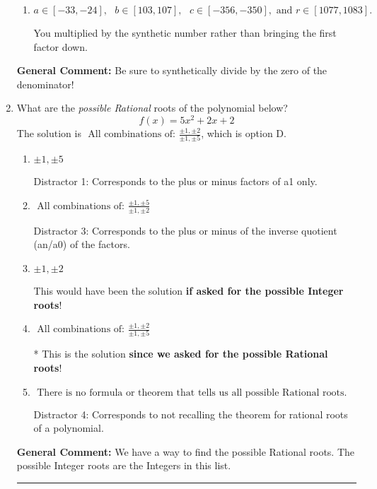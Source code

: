 \documentclass{extbook}[14pt]
\newcommand{\litem}[1]{\item #1

\rule{\textwidth}{0.4pt}}
\begin{document}
\begin{enumerate}
{\begin{enumerate}[label=\Alph*.]
 You divided by the opposite of the factor AND multiplied the first factor rather than just bringing it down.
\item \( a \in [-33, -24], \text{   } b \in [103, 107], \text{   } c \in [-356, -350], \text{   and   } r \in [1077, 1083]. \)

 You multiplied by the synthetic number rather than bringing the first factor down.
\end{enumerate}

\textbf{General Comment:} Be sure to synthetically divide by the zero of the denominator!
}
\litem{
What are the \textit{possible Rational} roots of the polynomial below?
\[ f(x) = 5x^{2} +2 x + 2 \]The solution is \( \text{ All combinations of: }\frac{\pm 1,\pm 2}{\pm 1,\pm 5} \), which is option D.\begin{enumerate}[label=\Alph*.]
\item \( \pm 1,\pm 5 \)

 Distractor 1: Corresponds to the plus or minus factors of a1 only.
\item \( \text{ All combinations of: }\frac{\pm 1,\pm 5}{\pm 1,\pm 2} \)

 Distractor 3: Corresponds to the plus or minus of the inverse quotient (an/a0) of the factors. 
\item \( \pm 1,\pm 2 \)

This would have been the solution \textbf{if asked for the possible Integer roots}!
\item \( \text{ All combinations of: }\frac{\pm 1,\pm 2}{\pm 1,\pm 5} \)

* This is the solution \textbf{since we asked for the possible Rational roots}!
\item \( \text{ There is no formula or theorem that tells us all possible Rational roots.} \)

 Distractor 4: Corresponds to not recalling the theorem for rational roots of a polynomial.
\end{enumerate}

\textbf{General Comment:} We have a way to find the possible Rational roots. The possible Integer roots are the Integers in this list.
}
\end{enumerate}
\end{document}
